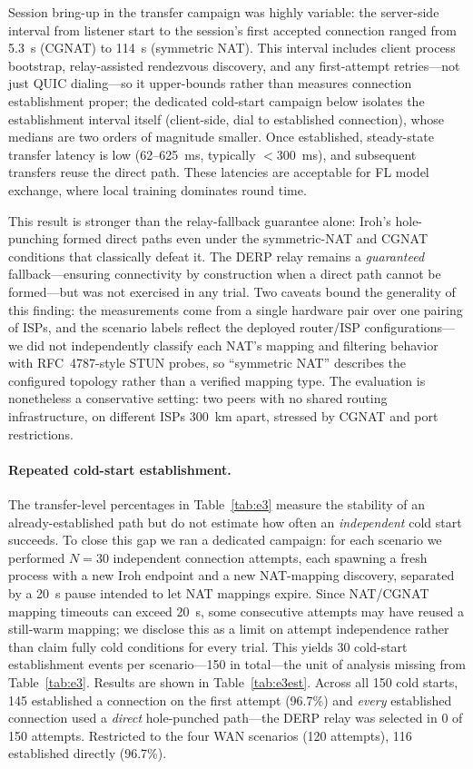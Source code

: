 \documentclass[a4paper,fleqn]{cas-dc}
\begin{document}
Session bring-up in the transfer campaign was highly variable: the server-side interval from listener start to the session's first accepted connection ranged from 5.3~s (CGNAT) to 114~s (symmetric NAT). This interval includes client process bootstrap, relay-assisted rendezvous discovery, and any first-attempt retries---not just QUIC dialing---so it upper-bounds rather than measures connection establishment proper; the dedicated cold-start campaign below isolates the establishment interval itself (client-side, dial to established connection), whose medians are two orders of magnitude smaller. Once established, steady-state transfer latency is low (62--625~ms, typically $<$300~ms), and subsequent transfers reuse the direct path. These latencies are acceptable for FL model exchange, where local training dominates round time.

This result is stronger than the relay-fallback guarantee alone: Iroh's hole-punching formed direct paths even under the symmetric-NAT and CGNAT conditions that classically defeat it. The DERP relay remains a \emph{guaranteed} fallback---ensuring connectivity by construction when a direct path cannot be formed---but was not exercised in any trial. Two caveats bound the generality of this finding: the measurements come from a single hardware pair over one pairing of ISPs, and the scenario labels reflect the deployed router/ISP configurations---we did not independently classify each NAT's mapping and filtering behavior with RFC~4787-style STUN probes, so ``symmetric NAT'' describes the configured topology rather than a verified mapping type. The evaluation is nonetheless a conservative setting: two peers with no shared routing infrastructure, on different ISPs 300~km apart, stressed by CGNAT and port restrictions.

\paragraph{Repeated cold-start establishment.}
The transfer-level percentages in Table~\ref{tab:e3} measure the stability of an already-established path but do not estimate how often an \emph{independent} cold start succeeds. To close this gap we ran a dedicated campaign: for each scenario we performed $N{=}30$ independent connection attempts, each spawning a fresh process with a new Iroh endpoint and a new NAT-mapping discovery, separated by a 20~s pause intended to let NAT mappings expire. Since NAT/CGNAT mapping timeouts can exceed 20~s, some consecutive attempts may have reused a still-warm mapping; we disclose this as a limit on attempt independence rather than claim fully cold conditions for every trial. This yields 30 cold-start establishment events per scenario---150 in total---the unit of analysis missing from Table~\ref{tab:e3}. Results are shown in Table~\ref{tab:e3est}. Across all 150 cold starts, 145 established a connection on the first attempt (96.7\%) and \emph{every} established connection used a \emph{direct} hole-punched path---the DERP relay was selected in 0 of 150 attempts. Restricted to the four WAN scenarios (120 attempts), 116 established directly (96.7\%).
\end{document}

